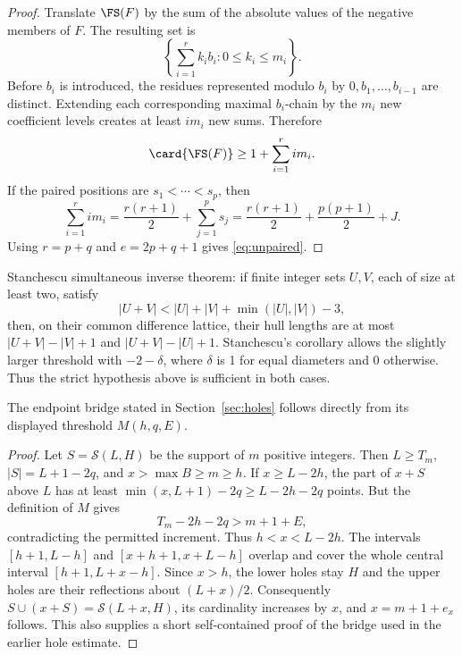 \begin{proof}
Translate $\FS(F)$ by the sum of the absolute values of the negative members
of $F$.  The resulting set is
\[
 \left\{\sum_{i=1}^r k_i b_i:0\leq k_i\leq m_i\right\}.
\]
Before $b_i$ is introduced, the residues represented modulo $b_i$ by
$0,b_1,\ldots,b_{i-1}$ are distinct.  Extending each corresponding maximal
$b_i$-chain by the $m_i$ new coefficient levels creates at least $i m_i$
new sums.  Therefore
\[
 \card{\FS(F)}\geq1+\sum_{i=1}^r i m_i.
\]
If the paired positions are $s_1<\cdots<s_p$, then
\[
 \sum_{i=1}^r i m_i
 =\frac{r(r+1)}2+\sum_{j=1}^p s_j
 =\frac{r(r+1)}2+\frac{p(p+1)}2+J.
\]
Using $r=p+q$ and $e=2p+q+1$ gives \eqref{eq:unpaired}.
\end{proof}

Stanchescu simultaneous inverse theorem: if finite integer sets $U,V$, each of
size at least two, satisfy
\[
 |U+V|<|U|+|V|+\min(|U|,|V|)-3,
\]
then, on their common difference lattice, their hull lengths are at most
$|U+V|-|V|+1$ and $|U+V|-|U|+1$. Stanchescu's corollary allows the slightly
larger threshold with $-2-\delta$, where $\delta$ is 1 for equal diameters
and 0 otherwise. Thus the strict hypothesis above is sufficient in both cases.

\begin{lemma}\label{lem:bridge-proof}
The endpoint bridge stated in Section~\ref{sec:holes} follows directly from
its displayed threshold $M(h,q,E)$.
\end{lemma}
\begin{proof}
Let $S=\mathcal S(L,H)$ be the support of $m$ positive integers. Then
$L\geq T_m$, $|S|=L+1-2q$, and $x>\max B\geq m\geq h$.
If $x\geq L-2h$, the part of $x+S$ above $L$ has at least
$\min(x,L+1)-2q\geq L-2h-2q$ points. But the definition of $M$ gives
\[
 T_m-2h-2q>m+1+E,
\]
contradicting the permitted increment. Thus $h<x<L-2h$.
The intervals $[h+1,L-h]$ and $[x+h+1,x+L-h]$ overlap and cover the
whole central interval $[h+1,L+x-h]$. Since $x>h$, the lower holes stay $H$
and the upper holes are their reflections about $(L+x)/2$.
Consequently $S\cup(x+S)=\mathcal S(L+x,H)$, its cardinality increases by
$x$, and $x=m+1+e_x$ follows. This also supplies a short self-contained proof
of the bridge used in the earlier hole estimate.
\end{proof}


